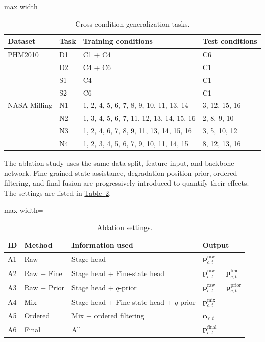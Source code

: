 \documentclass[a4paper,fleqn]{cas-sc}
\providecommand{\tabref}{}
\renewcommand{\tabref}[1]{\hyperref[#1]{Table~\ref*{#1}}}
\begin{document}
  \begin{table}[!htbp]
    \centering
    \scriptsize
  \caption{Cross-condition generalization tasks.}
    \label{tab:4}
    \begin{adjustbox}{max width=\textwidth}
      \begin{tabular}{llll}
        \toprule
        \textbf{Dataset} & \textbf{Task} & \textbf{Training conditions} & \textbf{Test conditions} \\
        \midrule
        PHM2010 & D1 & C1 + C4 & C6 \\
        & D2 & C4 + C6 & C1 \\
        & S1 & C4 & C1 \\
        & S2 & C6 & C1 \\
        NASA Milling & N1 & 1, 2, 4, 5, 6, 7, 8, 9, 10, 11, 13, 14 & 3, 12, 15, 16 \\
        & N2 & 1, 3, 4, 5, 6, 7, 11, 12, 13, 14, 15, 16 & 2, 8, 9, 10 \\
        & N3 & 1, 2, 4, 6, 7, 8, 9, 11, 13, 14, 15, 16 & 3, 5, 10, 12 \\
        & N4 & 1, 2, 3, 4, 5, 6, 7, 9, 10, 11, 14, 15 & 8, 12, 13, 16 \\
        \bottomrule
      \end{tabular}
    \end{adjustbox}
  \end{table}
  The ablation study uses the same data split, feature input, and backbone network. Fine-grained state assistance, degradation-position prior, ordered filtering, and final fusion are progressively introduced to quantify their effects. The settings are listed in \tabref{tab:5}.

  \begin{table}[!htbp]
    \centering
    \scriptsize
  \caption{Ablation settings.}
    \label{tab:5}
    \begin{adjustbox}{max width=\textwidth}
      \begin{tabular}{llll}
        \toprule
        \textbf{ID} & \textbf{Method} & \textbf{Information used} & \textbf{Output} \\
        \midrule
        A1 & Raw & Stage head & $\mathbf{p}_{c,t}^{\mathrm{raw}}$ \\
        A2 & Raw + Fine & Stage head + Fine-state head & $\mathbf{p}_{c,t}^{\mathrm{raw}}$ + $\mathbf{p}_{c,t}^{\mathrm{fine}}$ \\
        A3 & Raw + Prior & Stage head + $q$-prior & $\mathbf{p}_{c,t}^{\mathrm{raw}}$ + $\mathbf{p}_{c,t}^{\mathrm{prior}}$ \\
        A4 & Mix & Stage head + Fine-state head + $q$-prior & $\mathbf{p}_{c,t}^{\mathrm{mix}}$ \\
        A5 & Ordered & Mix + ordered filtering & $\boldsymbol{\alpha}_{c,t}$ \\
        A6 & Final & All & $\mathbf{p}_{c,t}^{\mathrm{final}}$ \\
        \bottomrule
      \end{tabular}
    \end{adjustbox}
  \end{table}
\end{document}
